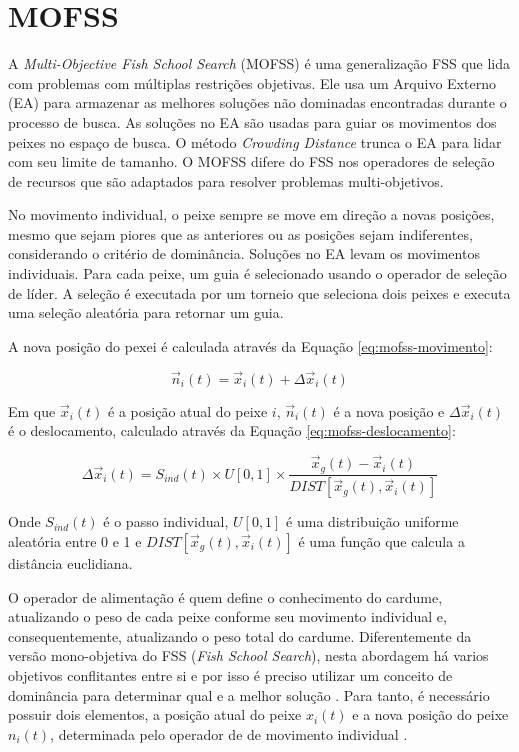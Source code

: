 \section{MOFSS}
\label{sec-mofss}

A \textit{Multi-Objective Fish School Search} (MOFSS) é uma generalização FSS que lida com problemas com múltiplas restrições objetivas. Ele usa um Arquivo Externo (EA) para armazenar as melhores soluções não dominadas encontradas durante o processo de busca. As soluções no EA são usadas para guiar os movimentos dos peixes no espaço de busca. O método \textit{Crowding Distance} trunca o EA para lidar com seu limite de tamanho. O MOFSS difere do FSS nos operadores de seleção de recursos que são adaptados para resolver problemas multi-objetivos.

No movimento individual, o peixe sempre se move em direção a novas posições, mesmo que sejam piores que as anteriores ou as posições sejam indiferentes, considerando o critério de dominância. Soluções no EA levam os movimentos individuais. Para cada peixe, um guia é selecionado usando o operador de seleção de líder. A seleção é executada por um torneio que seleciona dois peixes e executa uma seleção aleatória para retornar um guia.

A nova posição do pexei é calculada através da Equação \ref{eq:mofss-movimento}:

\begin{equation} \label{eq:mofss-movimento}
    \vec{n}_{i}(t) = \vec{x}_{i}(t) + \Delta\vec{x}_{i}(t)
\end{equation}

Em que $\vec{x}_{i}(t)$ é a posição atual do peixe $i$, $\vec{n}_{i}(t) $ é a nova posição e $\Delta\vec{x}_{i}(t)$ é o deslocamento, calculado através da Equação \ref{eq:mofss-deslocamento}:

\begin{equation} \label{eq:mofss-deslocamento}
    \Delta\vec{x}_{i}(t) = S_{ind}(t) \times U[0,1] \times \frac{\vec{x}_{g}(t) - \vec{x}_{i}(t)}{DIST[\vec{x}_{g}(t), \vec{x}_{i}(t)]}
\end{equation}

Onde $S_{ind}(t)$ é o passo individual, $U[0,1]$ é uma distribuição uniforme aleatória entre 0 e 1 e $DIST[\vec{x}_{g}(t), \vec{x}_{i}(t)]$ é uma função que calcula a distância euclidiana.

O operador de alimentação é quem define o conhecimento do cardume, atualizando o peso de cada peixe conforme seu movimento individual e, consequentemente, atualizando o peso total do cardume. Diferentemente da versão mono-objetiva do FSS (\textit{Fish School Search}), nesta abordagem há varios objetivos conflitantes entre si e por isso é preciso utilizar um conceito de dominância para determinar qual e a melhor solução \cite{bastos2015multi}. Para tanto, é necessário possuir dois elementos, a posição atual do peixe $x_{i}(t)$ e a nova posição do peixe $n_{i}(t)$, determinada pelo operador de de movimento individual \cite{bastos2015multi}.

